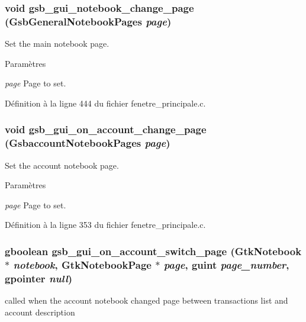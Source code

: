 \subsubsection[{gsb\_\-gui\_\-notebook\_\-change\_\-page}]{\setlength{\rightskip}{0pt plus 5cm}void gsb\_\-gui\_\-notebook\_\-change\_\-page ({\bf GsbGeneralNotebookPages} {\em page})}\label{fenetre__principale_8h_ae7636cbe5e0d42949754b905193ce99d}
Set the main notebook page.


\begin{DoxyParams}{Paramètres}
\item[{\em page}]Page to set. \end{DoxyParams}


Définition à la ligne 444 du fichier fenetre\_\-principale.c.

\subsubsection[{gsb\_\-gui\_\-on\_\-account\_\-change\_\-page}]{\setlength{\rightskip}{0pt plus 5cm}void gsb\_\-gui\_\-on\_\-account\_\-change\_\-page ({\bf GsbaccountNotebookPages} {\em page})}\label{fenetre__principale_8h_a94dc9871dffaaec186f7933619418064}
Set the account notebook page.


\begin{DoxyParams}{Paramètres}
\item[{\em page}]Page to set. \end{DoxyParams}


Définition à la ligne 353 du fichier fenetre\_\-principale.c.

\subsubsection[{gsb\_\-gui\_\-on\_\-account\_\-switch\_\-page}]{\setlength{\rightskip}{0pt plus 5cm}gboolean gsb\_\-gui\_\-on\_\-account\_\-switch\_\-page (GtkNotebook $\ast$ {\em notebook}, \/  GtkNotebookPage $\ast$ {\em page}, \/  guint {\em page\_\-number}, \/  gpointer {\em null})}\label{fenetre__principale_8h_ac472c4356247af478d93db80f99a2792}
called when the account notebook changed page between transactions list and account description


